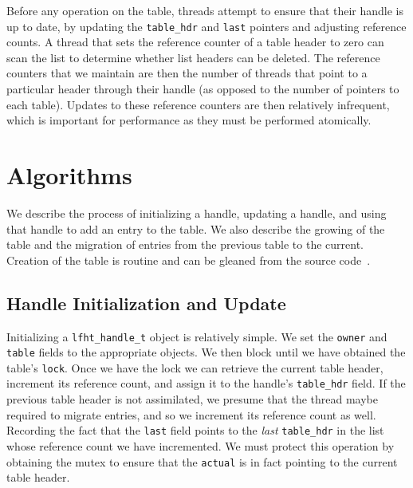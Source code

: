 Before any operation on the table, threads attempt to ensure that
their handle is up to date, by updating the \texttt{table\_hdr} and
\texttt{last} pointers and adjusting reference counts. A thread that
sets the reference counter of a table header to zero can scan the list
to determine whether list headers can be deleted. The reference
counters that we maintain are then the number of threads that point to
a particular header through their handle (as opposed to the number of
pointers to each table). Updates to these reference counters are then
relatively infrequent, which is important for performance as they must
be performed atomically.



\section{Algorithms}

We describe the process of initializing a handle, updating a handle,
and using that handle to add an entry to the table. We also describe
the growing of the table and the migration of entries from the
previous table to the current. Creation of the table is
routine and can be gleaned from the source code~\cite{lfht2017}.

\subsection{Handle Initialization and Update}

Initializing a \texttt{lfht\_handle\_t} object is relatively simple.
We set the \texttt{owner} and  \texttt{table} fields to the appropriate objects.
We then block until we have obtained the table's \texttt{lock}. Once we have the lock
we can retrieve the current table header, increment its reference count, and
assign it to the handle's \texttt{table\_hdr} field. If the previous table header
is not assimilated, we presume that the thread maybe required to migrate entries,
and so we increment its reference count as well. Recording the fact that
the \texttt{last} field points to the {\em last}  \texttt{table\_hdr} in the list
whose reference count we have incremented.
We must protect this operation by obtaining the mutex to ensure that the \texttt{actual}
is in fact pointing to the current table header.



